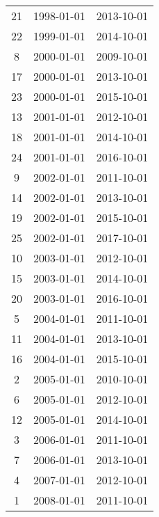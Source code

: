 % 
\begin{tabular}{ccc}
  \hline
  \hline
21 & 1998-01-01 & 2013-10-01 \\ 
  22 & 1999-01-01 & 2014-10-01 \\ 
  8 & 2000-01-01 & 2009-10-01 \\ 
  17 & 2000-01-01 & 2013-10-01 \\ 
  23 & 2000-01-01 & 2015-10-01 \\ 
  13 & 2001-01-01 & 2012-10-01 \\ 
  18 & 2001-01-01 & 2014-10-01 \\ 
  24 & 2001-01-01 & 2016-10-01 \\ 
  9 & 2002-01-01 & 2011-10-01 \\ 
  14 & 2002-01-01 & 2013-10-01 \\ 
  19 & 2002-01-01 & 2015-10-01 \\ 
  25 & 2002-01-01 & 2017-10-01 \\ 
  10 & 2003-01-01 & 2012-10-01 \\ 
  15 & 2003-01-01 & 2014-10-01 \\ 
  20 & 2003-01-01 & 2016-10-01 \\ 
  5 & 2004-01-01 & 2011-10-01 \\ 
  11 & 2004-01-01 & 2013-10-01 \\ 
  16 & 2004-01-01 & 2015-10-01 \\ 
  2 & 2005-01-01 & 2010-10-01 \\ 
  6 & 2005-01-01 & 2012-10-01 \\ 
  12 & 2005-01-01 & 2014-10-01 \\ 
  3 & 2006-01-01 & 2011-10-01 \\ 
  7 & 2006-01-01 & 2013-10-01 \\ 
  4 & 2007-01-01 & 2012-10-01 \\ 
  1 & 2008-01-01 & 2011-10-01 \\ 
   \hline
\end{tabular}
